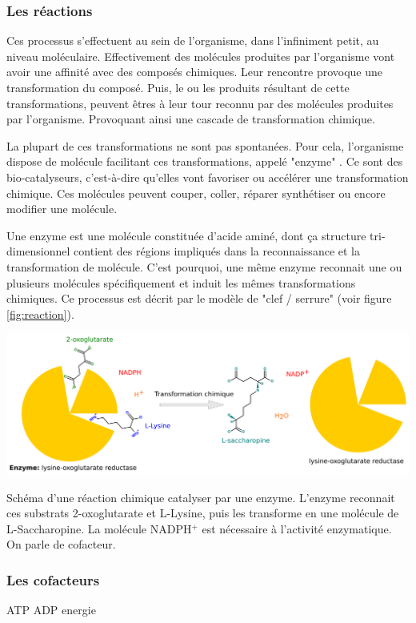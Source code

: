 \begin{refsection}
	\subsubsection{Les réactions}
	Ces processus s'effectuent au sein de l'organisme, dans l'infiniment petit, au niveau moléculaire. Effectivement des molécules produites par l'organisme vont avoir une affinité avec des composés chimiques. Leur rencontre provoque une transformation du composé. Puis, le ou les produits résultant de cette transformations, peuvent êtres à leur tour reconnu par des molécules produites par l'organisme. Provoquant ainsi une cascade de transformation chimique.
	
	La plupart de ces transformations ne sont pas spontanées. Pour cela, l'organisme dispose de molécule facilitant ces transformations, appelé "enzyme" . Ce sont des bio-catalyseurs, c'est-à-dire qu'elles vont favoriser ou accélérer une transformation chimique. Ces molécules peuvent couper, coller, réparer synthétiser ou encore modifier une molécule.
	
	Une enzyme est une molécule constituée d'acide aminé, dont ça structure tri-dimensionnel contient des régions impliqués dans la reconnaissance et la transformation de molécule. C'est pourquoi, une même enzyme reconnait une ou plusieurs molécules spécifiquement et induit les mêmes transformations chimiques. Ce processus est décrit par le modèle de "clef / serrure" (voir figure \ref{fig:reaction}).
	\begin{shadedfigure}
		\centering
		\includegraphics[width=\textwidth]{img/lysine-oxoglutarate_reductase.png}
		\caption{Schéma d'une réaction chimique catalyser par une enzyme. L'enzyme reconnait ces substrats 2-oxoglutarate et L-Lysine, puis les transforme en une molécule de L-Saccharopine. La molécule NADPH$^{+}$ est nécessaire à l'activité enzymatique. On parle de cofacteur.}
		\label{fig:reaction}
	\end{shadedfigure}
    
    \subsubsection{Les cofacteurs}
    ATP ADP energie
    

\end{refsection}
